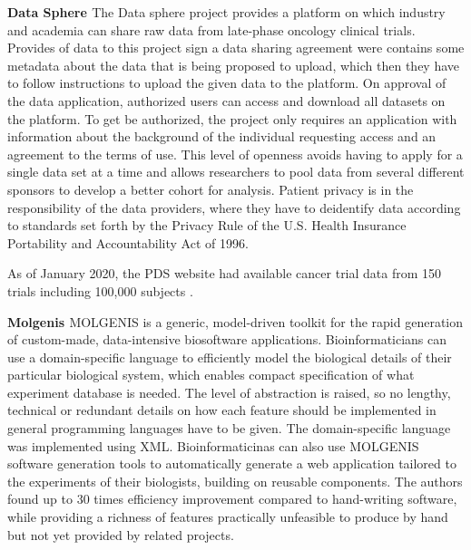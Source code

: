 \textbf{Data Sphere \cite{datasphere}}
The Data sphere project provides a platform on which industry and academia can share
raw data from late-phase oncology clinical trials.
Provides of data to this project sign a data sharing agreement were contains some
metadata about the data that is being proposed to upload, which then they have to
follow instructions to upload the given data to the platform.
On approval of the data application, authorized users can access and download all
datasets on the platform.
To get be authorized, the project only requires an application with information about
the background of the individual requesting access and an agreement to the terms of
use.
This level of openness avoids having to apply for a single data set at a time and
allows researchers to pool data from several different sponsors to develop a better
cohort for analysis.
Patient privacy is in the responsibility of the data providers, where they have to
deidentify data according to standards set forth by the Privacy Rule of the U.S. Health
Insurance Portability and Accountability Act of 1996.

As of January 2020, the PDS website had available cancer trial data from 150 trials
including 100,000 subjects \cite{datasphere-site}.

\textbf{Molgenis \cite{molgenis}}
MOLGENIS is a generic, model-driven toolkit for the rapid generation of custom-made,
data-intensive biosoftware applications.
Bioinformaticians can use a domain-specific language to efficiently model the
biological details of their particular biological system, which enables compact
specification of what experiment database is needed.
The level of abstraction is raised, so no lengthy, technical or redundant details on
how each feature should be implemented in general programming languages have to be
given. The domain-specific language was implemented using XML.
Bioinformaticinas can also use MOLGENIS software generation tools to automatically
generate a web application tailored to the experiments of their biologists, building on
reusable components.
The authors found up to 30 times efficiency improvement compared to hand-writing
software, while providing a richness of features practically unfeasible to produce by
hand but not yet provided by related projects.


